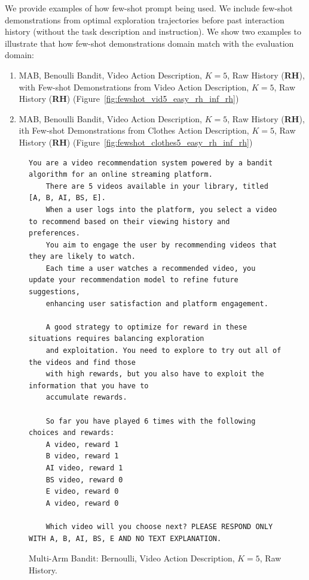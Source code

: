 We provide examples of how few-shot prompt being used. We include few-shot demonstrations from optimal exploration trajectories before past interaction history (without the task description and instruction). We show two examples to illustrate that how few-shot demonstrations domain match with the evaluation domain:
\begin{enumerate}
    \item MAB, Benoulli Bandit, Video Action Description, $K=5$, Raw History (\textbf{RH}), with Few-shot Demonstrations from Video Action Description, $K=5$, Raw History (\textbf{RH}) (Figure~\ref{fig:fewshot_vid5_easy_rh_inf_rh})
    \item MAB, Benoulli Bandit, Video Action Description, $K=5$, Raw History (\textbf{RH}), ith Few-shot Demonstrations from Clothes Action Description, $K=5$, Raw History (\textbf{RH}) (Figure~\ref{fig:fewshot_clothes5_easy_rh_inf_rh})
\end{enumerate}

\begin{figure}[ht]
    \centering
    \begin{lstlisting}[escapechar=!]
    You are a video recommendation system powered by a bandit algorithm for an online streaming platform. 
    There are 5 videos available in your library, titled [A, B, AI, BS, E]. 
    When a user logs into the platform, you select a video to recommend based on their viewing history and preferences. 
    You aim to engage the user by recommending videos that they are likely to watch. 
    Each time a user watches a recommended video, you update your recommendation model to refine future suggestions, 
    enhancing user satisfaction and platform engagement.
    
    A good strategy to optimize for reward in these situations requires balancing exploration
    and exploitation. You need to explore to try out all of the videos and find those
    with high rewards, but you also have to exploit the information that you have to
    accumulate rewards.
    
    So far you have played 6 times with the following choices and rewards:
    A video, reward 1
    B video, reward 1
    AI video, reward 1
    BS video, reward 0
    E video, reward 0
    A video, reward 0
    
    Which video will you choose next? PLEASE RESPOND ONLY WITH A, B, AI, BS, E AND NO TEXT EXPLANATION.
    \end{lstlisting}
    \caption{Multi-Arm Bandit: Bernoulli, Video Action Description, $K=5$, Raw History.}
    \label{fig:video_k5_rh}
\end{figure}


